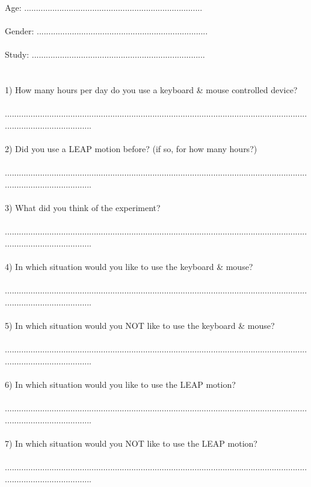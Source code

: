 \begin{appendix}
{Age: ............................................................................\\
\\
Gender: .........................................................................\\
\\
Study: ..........................................................................\\
\\
\\
1) How many hours per day do you use a keyboard \& mouse controlled device?\\
\\
......................................................................................................................................................................\\
\\
2) Did you use a LEAP motion before? (if so, for how many hours?)\\
\\
......................................................................................................................................................................\\
\\
3) What did you think of the experiment?\\
\\
......................................................................................................................................................................\\
\\
4) In which situation would you like to use the keyboard \& mouse?\\
\\
......................................................................................................................................................................\\
\\
5) In which situation would you NOT like to use the keyboard \& mouse?\\
\\
......................................................................................................................................................................\\
\\
6) In which situation would you like to use the LEAP motion?\\
\\
......................................................................................................................................................................\\
\\
7) In which situation would you NOT like to use the LEAP motion?\\
\\
......................................................................................................................................................................}


\end{appendix}
